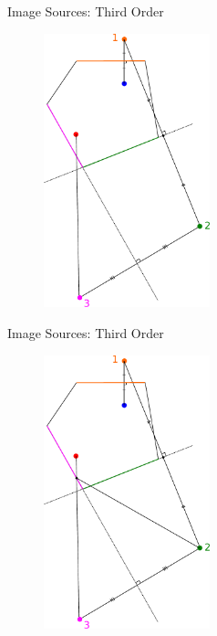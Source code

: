 \documentclass{beamer}
\begin{document}
\begin{frame}{Image Sources: Third Order}

\begin{figure}[t]
	\centering
    \includegraphics[width=0.43\textwidth]{ImageSources2MultiDrawn1.pdf}
\end{figure}

\end{frame}


\begin{frame}{Image Sources: Third Order}

\begin{figure}[t]
	\centering
    \includegraphics[width=0.43\textwidth]{ImageSources2MultiDrawn2.pdf}
\end{figure}

\end{frame}
\end{document}
